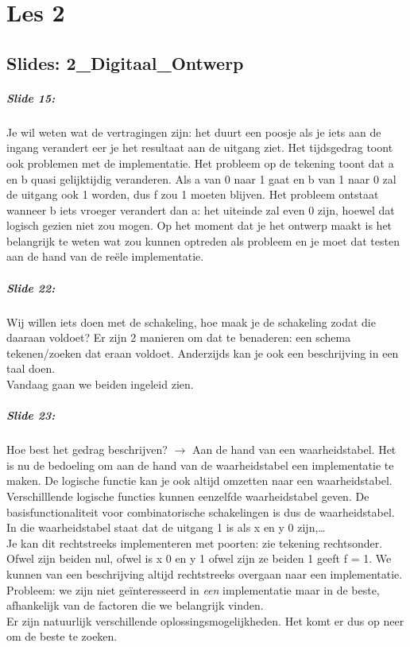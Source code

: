 \documentclass[10pt,a4paper]{book}
\begin{document}
\chapter{Les 2}
\section{Slides: 2\_Digitaal\_Ontwerp}

\paragraph{Slide 15:} Je wil weten wat de vertragingen zijn: het duurt een poosje als je iets aan de ingang verandert eer je het resultaat aan de uitgang ziet. Het tijdsgedrag toont ook problemen met de implementatie. Het probleem op de tekening toont dat a en b quasi gelijktijdig veranderen. Als a van 0 naar 1 gaat en b van 1 naar 0 zal de uitgang ook 1 worden, dus f zou 1 moeten blijven. Het probleem ontstaat wanneer b iets vroeger verandert dan a: het uiteinde zal even 0 zijn, hoewel dat logisch gezien niet zou mogen. Op het moment dat je het ontwerp maakt is het belangrijk te weten wat zou kunnen optreden als probleem en je moet dat testen aan de hand van de re\"ele implementatie.

\paragraph{Slide 22:} Wij willen iets doen met de schakeling, hoe maak je de schakeling zodat die daaraan voldoet? Er zijn 2 manieren om dat te benaderen: een schema tekenen/zoeken dat eraan voldoet. Anderzijds kan je ook een beschrijving in een taal doen.\\
Vandaag gaan we beiden ingeleid zien.

\paragraph{Slide 23:} Hoe best het gedrag beschrijven? $\rightarrow$ Aan de hand van een waarheidstabel. Het is nu de bedoeling om aan de hand van de waarheidstabel een implementatie te maken. De logische functie kan je ook altijd omzetten naar een waarheidstabel. Verschilllende logische functies kunnen eenzelfde waarheidstabel geven. De basisfunctionaliteit voor combinatorische schakelingen is dus de waarheidstabel.\\
In die waarheidstabel staat dat de uitgang 1 is als x en y 0 zijn,\ldots \\
Je kan dit rechtstreeks implementeren met poorten: zie tekening rechtsonder.\\
Ofwel zijn beiden nul, ofwel is x 0 en y 1 ofwel zijn ze beiden 1 geeft f = 1. We kunnen van een beschrijving altijd rechtstreeks overgaan naar een implementatie. Probleem: we zijn niet ge\"interesseerd in \emph{een} implementatie maar in de beste, afhankelijk van de factoren die we belangrijk vinden. \\
Er zijn natuurlijk verschillende oplossingsmogelijkheden. Het komt er dus op neer om de beste te zoeken.
\end{document}
